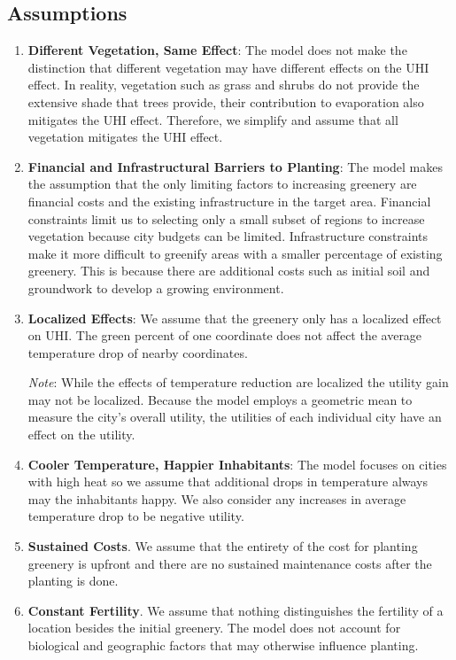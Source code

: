\documentclass[11pt]{article}
\begin{document}
\subsection{Assumptions}
\begin{enumerate}
    \item \textbf{Different Vegetation, Same Effect}: The model does not make the distinction that different vegetation may have different effects on the UHI effect. In reality, vegetation such as grass and shrubs do not provide the extensive shade that trees provide, their contribution to evaporation also mitigates the UHI effect. Therefore, we simplify and assume that all vegetation mitigates the UHI effect.

    \item \textbf{Financial and Infrastructural Barriers to Planting}: The model makes the assumption that the only limiting factors to increasing greenery are financial costs and the existing infrastructure in the target area. Financial constraints limit us to selecting only a small subset of regions to increase vegetation because city budgets can be limited. Infrastructure constraints make it more difficult to greenify areas with a smaller percentage of existing greenery. This is because there are additional costs such as initial soil and groundwork to develop a growing environment.

    \item \textbf{Localized Effects}: We assume that the greenery only has a localized effect on UHI. The green percent of one coordinate does not affect the average temperature drop of nearby coordinates.

    \textit{Note}: While the effects of temperature reduction are localized the utility gain may not be localized. Because the model employs a geometric mean to measure the city's overall utility, the utilities of each individual city have an effect on the utility.

    \item \textbf{Cooler Temperature, Happier Inhabitants}: The model focuses on cities with high heat so we assume that additional drops in temperature always may the inhabitants happy. We also consider any increases in average temperature drop to be negative utility.

    \item \textbf{Sustained Costs}. We assume that the entirety of the cost for planting greenery is upfront and there are no sustained maintenance costs after the planting is done.

    \item \textbf{Constant Fertility}. We assume that nothing distinguishes the fertility of a location besides the initial greenery. The model does not account for biological and geographic factors that may otherwise influence planting.
\end{enumerate}
\end{document}
